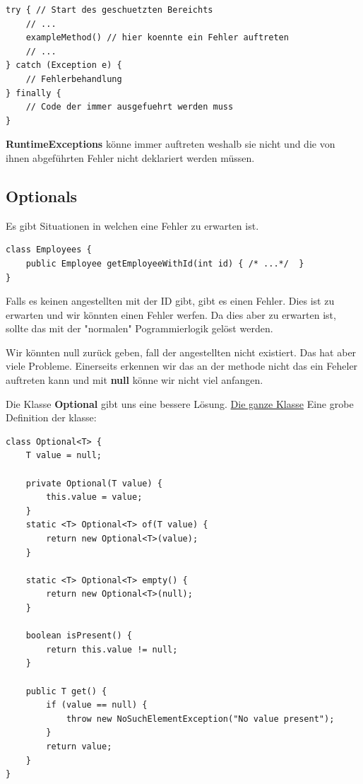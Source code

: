 \documentclass[12pt]{article}
\begin{document}
    \begin{lstlisting}
try { // Start des geschuetzten Bereichts
    // ...
    exampleMethod() // hier koennte ein Fehler auftreten
    // ...
} catch (Exception e) {
    // Fehlerbehandlung
} finally {
    // Code der immer ausgefuehrt werden muss
}
    \end{lstlisting}

    \textbf{RuntimeExceptions} könne immer auftreten weshalb sie nicht und die von ihnen 
    abgeführten Fehler nicht deklariert werden müssen. 

    \subsection*{Optionals}

    Es gibt Situationen in welchen eine Fehler zu erwarten ist. 

    \begin{lstlisting}
class Employees {
    public Employee getEmployeeWithId(int id) { /* ...*/  }
}
    \end{lstlisting}

    Falls es keinen angestellten mit der ID gibt, gibt es einen Fehler. 
    Dies ist zu erwarten und wir könnten einen Fehler werfen. 
    Da dies aber zu erwarten ist, sollte das mit der "normalen" Pogrammierlogik gelöst 
    werden. 

    Wir könnten null zurück geben, fall der angestellten nicht existiert. Das
    hat aber viele Probleme. Einerseits erkennen wir das an der methode nicht das
    ein Feheler auftreten kann und mit \textbf{null} könne wir nicht viel anfangen. 

    Die Klasse \textbf{Optional} gibt uns eine bessere Lösung. 
    \href{https://docs.oracle.com/en/java/javase/17/docs/api/java.base/java/util/Optional.html}{Die ganze Klasse}
    Eine grobe Definition der klasse: 

    \begin{lstlisting}
class Optional<T> {
    T value = null;

    private Optional(T value) {
        this.value = value;
    }
    static <T> Optional<T> of(T value) { 
        return new Optional<T>(value);
    }

    static <T> Optional<T> empty() { 
        return new Optional<T>(null);
    }

    boolean isPresent() { 
        return this.value != null;
    }

    public T get() {
        if (value == null) {
            throw new NoSuchElementException("No value present");
        }
        return value;
    }
}
    \end{lstlisting}
\end{document}
